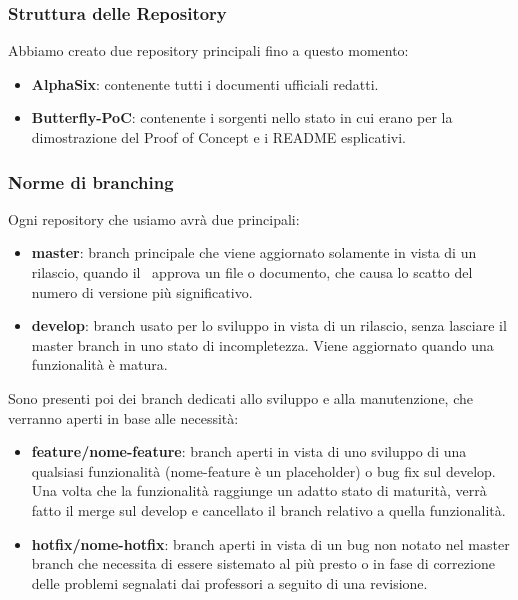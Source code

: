 	\subsubsection{Struttura delle Repository}
	Abbiamo creato due repository principali fino a questo momento:
	\begin{itemize}
		\item \textbf{AlphaSix}: contenente tutti i documenti ufficiali redatti.
		\item \textbf{Butterfly-PoC}: contenente i sorgenti nello stato in cui erano per la dimostrazione del Proof of Concept e i README esplicativi. 
	\end{itemize}

	\subsubsection{Norme di branching}
	Ogni repository che usiamo avrà due  principali:
	\begin{itemize}
		\item \textbf{master}: branch principale che viene aggiornato solamente in vista di un rilascio, quando il \Res\ approva un file o documento, che causa
			lo scatto del numero di versione più significativo.
		\item \textbf{develop}: branch usato per lo sviluppo in vista di un rilascio, senza lasciare il master branch in uno stato di incompletezza. Viene aggiornato
			quando una funzionalità è matura.
	\end{itemize}

	Sono presenti poi dei branch dedicati allo sviluppo e alla manutenzione, che verranno aperti in base alle necessità:
	\begin{itemize}
		\item \textbf{feature/nome-feature}: branch aperti in vista di uno sviluppo di una qualsiasi funzionalità (nome-feature è un placeholder) o bug fix sul develop.
			Una volta che la funzionalità raggiunge un adatto stato di maturità, verrà fatto il merge sul develop e cancellato il branch relativo a quella funzionalità.
		\item \textbf{hotfix/nome-hotfix}: branch aperti in vista di un bug non notato nel master branch che necessita di essere sistemato al più presto o in fase di
			correzione delle problemi segnalati dai professori a seguito di una revisione.
	\end{itemize}

